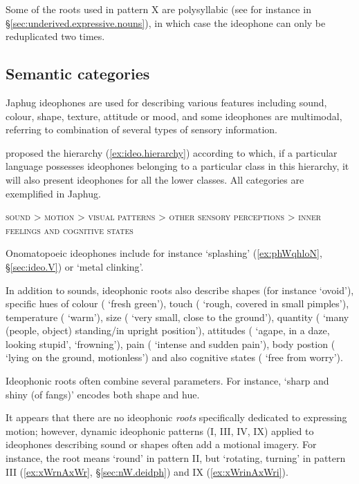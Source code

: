 Some of the roots used in pattern X are polysyllabic (see for instance  in §\ref{sec:underived.expressive.nouns}), in which case the ideophone can only be reduplicated two times.

  
\subsection{Semantic categories}
Japhug ideophones are used for describing various features including sound, colour, shape, texture, attitude or mood, and some ideophones are multimodal, referring to combination of several types of sensory information.

\citet[663]{dingemanse12ideo} proposed the hierarchy (\ref{ex:ideo.hierarchy}) according to which, if a particular language possesses ideophones belonging to a particular class in this hierarchy, it will also present ideophones for all the lower classes. All categories are exemplified in Japhug.

\begin{exe} 
\ex  \label{ex:ideo.hierarchy}
\glt \textsc{sound} > \textsc{motion} > \textsc{visual patterns}  > \textsc{other sensory perceptions} > \textsc{inner feelings and cognitive states}
\end{exe}

Onomatopoeic ideophones include for instance  `splashing' (\ref{ex:phWqhloN}, §\ref{sec:ideo.V}) or  `metal clinking'. 

In addition to sounds, ideophonic roots also describe shapes (for instance  `ovoid'), specific hues of colour ( `fresh green'), touch ( `rough, covered in small pimples'), temperature ( `warm'), size ( `very small, close to the ground'), quantity ( `many (people, object) standing/in upright position'), attitudes ( `agape, in a daze, looking stupid',  `frowning'), pain ( `intense and sudden pain'), body postion ( `lying on the ground, motionless') and also cognitive states ( `free from worry').


Ideophonic roots often combine several parameters. For instance,  `sharp and shiny (of fangs)' encodes both shape and hue.


It appears that there are no ideophonic \textit{roots} specifically dedicated to expressing motion; however, dynamic ideophonic patterns (I, III, IV, IX) applied to ideophones describing sound or shapes often add a motional imagery. For instance, the root  means `round' in pattern II, but `rotating, turning' in pattern III (\ref{ex:xWrnAxWr}, §\ref{sec:nW.deidph}) and IX (\ref{ex:xWrinAxWri}).

